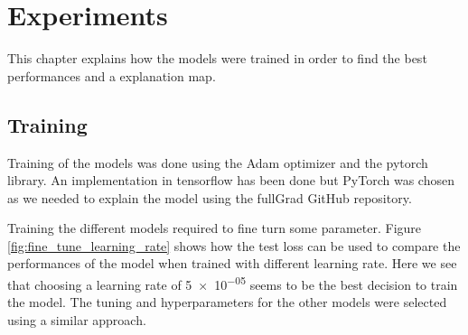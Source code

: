 \chapter{Experiments}
\label{chap:experiments}
This chapter explains how the models were trained in order to find the best performances and a explanation map.
\section{Training}
Training of the models was done using the Adam\cite{kingma2014adam} optimizer and the pytorch\cite{pytorch_paszke2017automatic} library. An implementation in tensorflow\cite{tensorflow_45166} has been done but PyTorch was chosen as we needed to explain the model using the fullGrad\cite{fullgradient} GitHub repository.

Training the different models required to fine turn some parameter. Figure \ref{fig:fine_tune_learning_rate} shows how the test loss can be used to compare the performances of the model when trained with different learning rate. Here we see that choosing a learning rate of \num{5e-05} seems to be the best decision to train the model. The tuning and hyperparameters for the other models were selected using a similar approach.  

